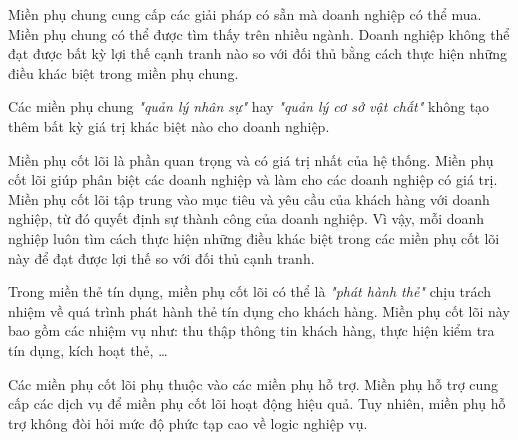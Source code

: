 
Miền phụ chung cung cấp các giải pháp có sẵn mà doanh nghiệp có thể mua. Miền phụ chung có thể được tìm thấy trên nhiều ngành. Doanh nghiệp không thể đạt được bất kỳ lợi thế cạnh tranh nào so với đối thủ bằng cách thực hiện những điều khác biệt trong miền phụ chung.

\begin{example} Các miền phụ chung \textit{"quản lý nhân sự"} hay \textit{"quản lý cơ sở vật chất"} không tạo thêm bất kỳ giá trị khác biệt nào cho doanh nghiệp.

\end{example}


Miền phụ cốt lõi là phần quan trọng và có giá trị nhất của hệ thống. Miền phụ cốt lõi giúp phân biệt các doanh nghiệp và làm cho các doanh nghiệp có giá trị. Miền phụ cốt lõi tập trung vào mục tiêu và yêu cầu của khách hàng với doanh nghiệp, từ đó quyết định sự thành công của doanh nghiệp. Vì vậy, mỗi doanh nghiệp luôn tìm cách thực hiện những điều khác biệt trong các miền phụ cốt lõi này để đạt được lợi thế so với đối thủ cạnh tranh.

\begin{example} Trong miền thẻ tín dụng, miền phụ cốt lõi có thể là \textit{"phát hành thẻ"} chịu trách nhiệm về quá trình phát hành thẻ tín dụng cho khách hàng. Miền phụ cốt lõi này bao gồm các nhiệm vụ như: thu thập thông tin khách hàng, thực hiện kiểm tra tín dụng, kích hoạt thẻ, \dots

\end{example}


Các miền phụ cốt lõi phụ thuộc vào các miền phụ hỗ trợ. Miền phụ hỗ trợ cung cấp các dịch vụ để miền phụ cốt lõi hoạt động hiệu quả. Tuy nhiên, miền phụ hỗ trợ không đòi hỏi mức độ phức tạp cao về logic nghiệp vụ.

